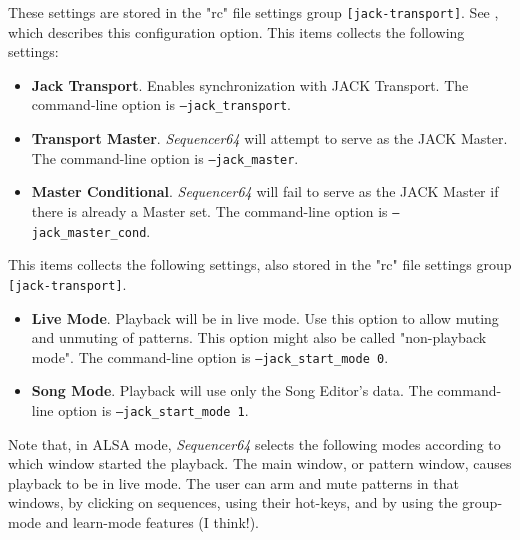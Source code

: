   \setcounter{ItemCounter}{0}      %

   These settings are stored in the "rc" file settings group
   \texttt{[jack-transport]}.
   See ,
   which describes this configuration option.
   This items collects the following settings:

   \begin{itemize}
      \item \textbf{Jack Transport}.
         Enables synchronization with JACK Transport.
         The command-line option is \texttt{--jack\_transport}.
      \item \textbf{Transport Master}.
         \textsl{Sequencer64} will attempt to serve as the JACK Master.
         The command-line option is \texttt{--jack\_master}.
      \item \textbf{Master Conditional}.
         \textsl{Sequencer64} will fail to serve as the JACK Master if there is
         already a Master set.
         The command-line option is \texttt{--jack\_master\_cond}.
   \end{itemize}

   This items collects the following settings, also stored in the "rc" file
   settings group \texttt{[jack-transport]}.

   \begin{itemize}
      \item \textbf{Live Mode}.
         Playback will be in live mode.  Use this option to allow muting and
         unmuting of patterns.  This option might also be called "non-playback
         mode".
         The command-line option is \texttt{--jack\_start\_mode 0}.
      \item \textbf{Song Mode}.
         Playback will use only the Song Editor's data.
         The command-line option is \texttt{--jack\_start\_mode 1}.
   \end{itemize}

   Note that, in ALSA mode, \textsl{Sequencer64} selects the following modes
   according to which window started the playback.  The main window, or pattern
   window, causes playback to be in live mode.  The user can arm and mute
   patterns in that windows, by clicking on sequences, using their hot-keys,
   and by using the group-mode and learn-mode features (I think!).


